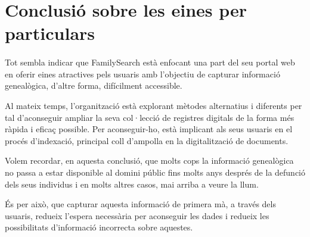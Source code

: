 \section{Conclusió sobre les eines per particulars}

    \paragraph{}
    Tot sembla indicar que  FamilySearch està enfocant una part del seu portal web en oferir eines atractives pels usuaris amb l'objectiu de capturar informació genealògica, d'altre forma, difícilment accessible.

    Al mateix temps, l’organització està explorant mètodes alternatius i diferents per tal d’aconseguir ampliar la seva col·lecció de registres digitals de la forma més ràpida i eficaç possible. Per aconseguir-ho, està implicant als seus usuaris en el procés d’indexació, principal coll d'ampolla en la digitalització de documents.

    Volem recordar, en aquesta conclusió, que molts cops la informació genealògica no passa a estar disponible al domini públic fins molts anys després de la defunció dels seus individus i en molts altres casos, mai arriba a veure la llum.

    És per això, que capturar aquesta informació de primera mà, a través dels usuaris, redueix l'espera necessària per aconseguir les dades i redueix les possibilitats d'informació incorrecta sobre aquestes.
